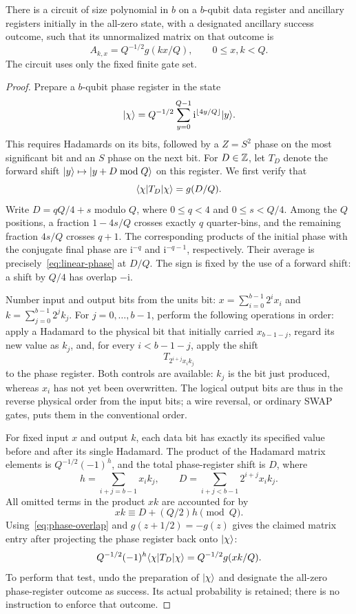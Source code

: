 \begin{lemma}\label{lem:transform}
There is a circuit of size polynomial in $b$ on a $b$-qubit data register
and ancillary registers initially in the all-zero state, with a designated
ancillary success outcome, such
that its unnormalized matrix on that outcome is
\[
 A_{k,x}=Q^{-1/2}g(kx/Q),\qquad 0\le x,k<Q.
\]
The circuit uses only the fixed finite gate set.
\end{lemma}

\begin{proof}
Prepare a $b$-qubit phase register in the state
\[
 \lvert \chi\rangle=Q^{-1/2}\sum_{y=0}^{Q-1}
                  \mathrm i^{\lfloor4y/Q\rfloor}\lvert y\rangle.
\]
This requires Hadamards on its bits, followed by a $Z=S^2$ phase on the
most significant bit and an $S$ phase on the next bit.
For $D\in\mathbb Z$, let $T_D$ denote the forward shift
$\lvert y\rangle\mapsto\lvert y+D\bmod Q\rangle$ on this register.  We first verify that
\begin{equation}\label{eq:phase-overlap}
 \langle \chi\rvert T_D\lvert \chi\rangle=g(D/Q).
\end{equation}
Write $D=qQ/4+s$ modulo $Q$, where $0\le q<4$ and $0\le s<Q/4$.
Among the $Q$ positions, a fraction $1-4s/Q$ crosses exactly $q$
quarter-bins, and the remaining fraction $4s/Q$ crosses $q+1$.
The corresponding products of the initial phase with the conjugate final
phase are $\mathrm i^{-q}$ and $\mathrm i^{-q-1}$, respectively.
Their average is precisely~\eqref{eq:linear-phase} at $D/Q$.
The sign is fixed by the use of a forward shift: a shift by $Q/4$ has
overlap $-\mathrm i$.

Number input and output bits from the units bit:
$x=\sum_{i=0}^{b-1}2^ix_i$ and $k=\sum_{j=0}^{b-1}2^jk_j$.
For $j=0,\ldots,b-1$, perform the following operations in order:
apply a Hadamard to the physical bit that initially carried $x_{b-1-j}$,
regard its new value as $k_j$, and, for every $i<b-1-j$, apply the shift
\[
 T_{2^{i+j}x_i k_j}
\]
to the phase register.  Both controls are available: $k_j$ is the bit
just produced, whereas $x_i$ has not yet been overwritten.  The logical
output bits are thus in the reverse physical order from the input bits;
a wire reversal, or ordinary SWAP gates, puts them in the conventional
order.

For fixed input $x$ and output $k$, each data bit has exactly its specified
value before and after its single Hadamard.  The product of the Hadamard
matrix elements is $Q^{-1/2}(-1)^h$, and the total phase-register shift is
$D$, where
\[
 h=\sum_{i+j=b-1}x_i k_j,
 \qquad
 D=\sum_{i+j<b-1}2^{i+j}x_i k_j.
\]
All omitted terms in the product $xk$ are accounted for by
\[
 xk\equiv D+(Q/2)h\pmod Q.
\]
Using~\eqref{eq:phase-overlap} and $g(z+1/2)=-g(z)$ gives the claimed
matrix entry after projecting the phase register back onto $\lvert \chi\rangle$:
\[
 Q^{-1/2}(-1)^h\langle \chi\rvert T_D\lvert \chi\rangle
       =Q^{-1/2}g(xk/Q).
\]
To perform that test, undo the preparation of $\lvert \chi\rangle$ and designate
the all-zero phase-register outcome as success.  Its actual probability
is retained; there is no instruction to enforce that outcome.


\end{proof}
